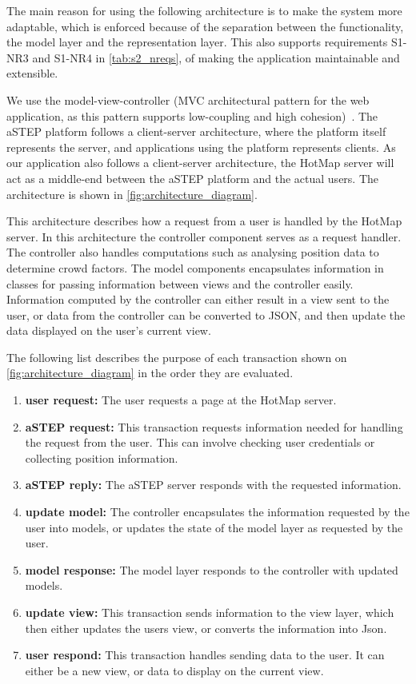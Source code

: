 The main reason for using the following architecture is to make the system more adaptable, which is enforced because of the separation between the functionality, the model layer and the representation layer. This also supports requirements S1-NR3 and S1-NR4 in \cref{tab:s2_nreqs}, of making the application maintainable and extensible.

We use the model-view-controller (MVC architectural pattern for the web application, as this pattern supports low-coupling and high cohesion)~\cite{website:MVC}. The aSTEP platform follows a client-server architecture, where the platform itself represents the server, and applications using the platform represents clients. As our application also follows a client-server architecture, the HotMap server will act as a middle-end between the aSTEP platform and the actual users. The architecture is shown in \cref{fig:architecture_diagram}.


This architecture describes how a request from a user is handled by the HotMap server. In this architecture the controller component serves as a request handler. The controller also handles computations such as analysing position data to determine crowd factors. The model components encapsulates information in classes for passing information between views and the controller easily. Information computed by the controller can either result in a view sent to the user, or data from the controller can be converted to JSON, and then update the data displayed on the user's current view. 


The following list describes the purpose of each transaction shown on \cref{fig:architecture_diagram} in the order they are evaluated.

\begin{enumerate}
    \item \textbf{user request:} The user requests a page at the HotMap server.
    \item \textbf{aSTEP request:} This transaction requests information needed for handling the request from the user. This can involve checking user credentials or collecting position information.
    \item \textbf{aSTEP reply:} The aSTEP server responds with the requested information.
    \item \textbf{update model:} The controller encapsulates the information requested by the user into models, or updates the state of the model layer as requested by the user.
    \item \textbf{model response:} The model layer responds to the controller with updated models.
    \item \textbf{update view:} This transaction sends information to the view layer, which then either updates the users view, or converts the information into Json.
    \item \textbf{user respond:} This transaction handles sending data to the user. It can either be a new view, or data to display on the current view.
\end{enumerate}

